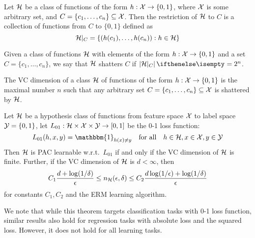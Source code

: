 \begin{definition}
  Let $\mathcal{H}$ be a class of functions of the form $h : \mathcal{X} \to \{0, 1\}$, where
  $\mathcal{X}$ is some arbitrary set, and $C = \{c_1, \ldots, c_n\} \subseteq \mathcal{X}$.
  Then the restriction of $\mathcal{H}$ to $C$ is a collection of functions from $C$ to
  $\{0, 1\}$ defined as
  \begin{equation}
    \mathcal{H}\vert_C = \{(h(c_1), \ldots, h(c_n)) : h \in \mathcal{H}\}
  \end{equation}
\end{definition}

\begin{definition}
  Given a class of functions $\mathcal{H}$ with elements of the form $h : \mathcal{X} \to \{0,
  1\}$ and a set $C = \{c_1, \ldots, c_n\}$, we say that $\mathcal{H}$ shatters $C$ if
  $\Abs{\CH\vert_C} = 2^n$.
\end{definition}

\begin{definition}
  The VC dimension of a class $\mathcal{H}$ of functions of the form $h : \mathcal{X} \to \{0,
  1\}$ is the maximal number $n$ such that any arbitrary set $C = \{c_1, \ldots,
  c_n\} \subseteq \mathcal{X}$ is shattered by $\mathcal{H}$.
\end{definition}

\begin{theorem}
  \label{thm:fundamental}
  Let $\mathcal{H}$ be a hypothesis class of functions from feature space $\mathcal{X}$ to label
  space $\mathcal{Y} = \{0, 1\}$, let $L_{01} : \mathcal{H} \times \mathcal{X} \times \mathcal{Y} \to [0, 1]$ be
  the 0-1 loss function:
  \begin{equation}
    L_{01}(h, x, y) = \mathbbm{1}_{h(x) \neq y} \quad \text{for all} \quad h \in
    \CH, x \in \CX, y \in \CY
  \end{equation}
  Then $\mathcal{H}$ is PAC learnable w.r.t.\ $L_{01}$ if and only if the VC dimension
  of $\mathcal{H}$ is finite. Further, if the VC dimension of $\mathcal{H}$ is $d < \infty$,
  then
  \begin{equation}
    C_1 \frac{d + \log(1 / \delta)}{\epsilon} \leq n_{\mathcal{H}}(\epsilon, \delta) \leq
    C_2 \frac{d \log(1 / \epsilon) + \log(1 / \delta)}{\epsilon}
  \end{equation}
  for constants $C_1, C_2$ and the ERM learning algorithm.
\end{theorem}

We note that while this theorem targets classification tasks with 0-1 loss
function, similar results also hold for regression tasks with absolute loss and
the squared loss. However, it does not hold for all learning tasks.

